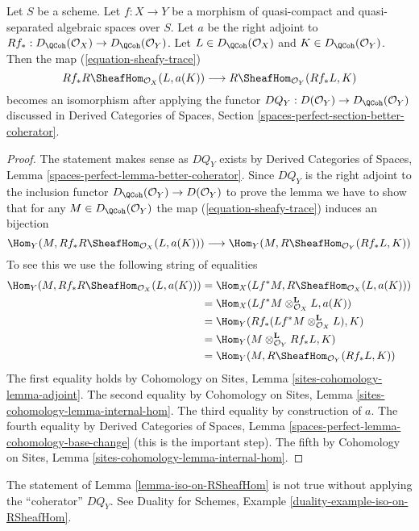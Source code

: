 \begin{lemma}
\label{lemma-iso-on-RSheafHom}
Let $S$ be a scheme.
Let $f : X \to Y$ be a morphism of quasi-compact and quasi-separated
algebraic spaces over $S$.
Let $a$ be the right adjoint to
$Rf_* : D_\QCoh(\mathcal{O}_X) \to D_\QCoh(\mathcal{O}_Y)$.
Let $L \in D_\QCoh(\mathcal{O}_X)$ and
$K \in D_\QCoh(\mathcal{O}_Y)$.
Then the map (\ref{equation-sheafy-trace})
$$
Rf_*R\SheafHom_{\mathcal{O}_X}(L, a(K))
\longrightarrow
R\SheafHom_{\mathcal{O}_Y}(Rf_*L, K)
$$
becomes an isomorphism after applying the functor
$DQ_Y : D(\mathcal{O}_Y) \to D_\QCoh(\mathcal{O}_Y)$
discussed in Derived Categories of Spaces, Section
\ref{spaces-perfect-section-better-coherator}.
\end{lemma}

\begin{proof}
The statement makes sense as $DQ_Y$ exists by
Derived Categories of Spaces, Lemma
\ref{spaces-perfect-lemma-better-coherator}.
Since $DQ_Y$ is the right adjoint to the inclusion
functor $D_\QCoh(\mathcal{O}_Y) \to D(\mathcal{O}_Y)$
to prove the lemma we have to show that for any
$M \in D_\QCoh(\mathcal{O}_Y)$
the map (\ref{equation-sheafy-trace}) induces an bijection
$$
\Hom_Y(M, Rf_*R\SheafHom_{\mathcal{O}_X}(L, a(K)))
\longrightarrow
\Hom_Y(M, R\SheafHom_{\mathcal{O}_Y}(Rf_*L, K))
$$
To see this we use the following string of equalities
\begin{align*}
\Hom_Y(M, Rf_*R\SheafHom_{\mathcal{O}_X}(L, a(K)))
& =
\Hom_X(Lf^*M, R\SheafHom_{\mathcal{O}_X}(L, a(K))) \\
& =
\Hom_X(Lf^*M \otimes_{\mathcal{O}_X}^\mathbf{L} L, a(K)) \\
& =
\Hom_Y(Rf_*(Lf^*M \otimes_{\mathcal{O}_X}^\mathbf{L} L), K) \\
& =
\Hom_Y(M \otimes_{\mathcal{O}_Y}^\mathbf{L} Rf_*L, K) \\
& =
\Hom_Y(M, R\SheafHom_{\mathcal{O}_Y}(Rf_*L, K))
\end{align*}
The first equality holds by Cohomology on Sites, Lemma
\ref{sites-cohomology-lemma-adjoint}.
The second equality by Cohomology on Sites, Lemma
\ref{sites-cohomology-lemma-internal-hom}.
The third equality by construction of $a$.
The fourth equality by Derived Categories of Spaces, Lemma
\ref{spaces-perfect-lemma-cohomology-base-change} (this is the important step).
The fifth by Cohomology on Sites, Lemma
\ref{sites-cohomology-lemma-internal-hom}.
\end{proof}

\begin{example}
\label{example-iso-on-RSheafHom}
The statement of Lemma \ref{lemma-iso-on-RSheafHom} is not true without
applying the ``coherator'' $DQ_Y$. See
Duality for Schemes, Example \ref{duality-example-iso-on-RSheafHom}.
\end{example}

